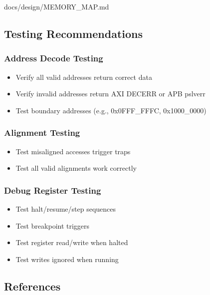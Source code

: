 \begin{relocated}{docs/design/MEMORY_MAP.md}
\subsection{Testing Recommendations}\label{ds:mm:memory-map:testing-recommendations}

\subsubsection{Address Decode Testing}\label{ds:mm:memory-map:address-decode-testing}

\begin{itemize}
\tightlist
\item
  Verify all valid addresses return correct data
\item
  Verify invalid addresses return AXI DECERR or APB pslverr
\item
  Test boundary addresses (e.g., 0x0FFF\_\allowbreak{}FFFC,
  0x1000\_\allowbreak{}0000)
\end{itemize}

\subsubsection{Alignment Testing}\label{ds:mm:memory-map:alignment-testing}

\begin{itemize}
\tightlist
\item
  Test misaligned accesses trigger traps
\item
  Test all valid alignments work correctly
\end{itemize}

\subsubsection{Debug Register Testing}\label{ds:mm:memory-map:debug-register-testing}

\begin{itemize}
\tightlist
\item
  Test halt/\allowbreak{}resume/\allowbreak{}step sequences
\item
  Test breakpoint triggers
\item
  Test register read/\allowbreak{}write when halted
\item
  Test writes ignored when running
\end{itemize}

\subsection{References}\label{ds:mm:memory-map:references}


\end{relocated}
